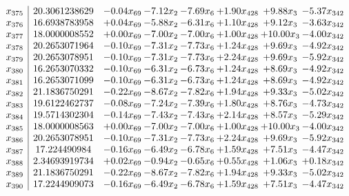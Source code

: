 \documentclass[8pt]{article}
\begin{document}
\[\begin{array}{c| c c@{\hskip 2pt} c@{\hskip 2pt} c@{\hskip 2pt} c@{\hskip 2pt} c@{\hskip 2pt} c@{\hskip 2pt} }
 x_{375}   &  20.3061238629 & -0.04 x_{69} & -7.12 x_{2} & -7.69 x_{6} & +  1.90 x_{428} & +  9.88 x_{3} & -5.37 x_{342}\\
 x_{376}   &  16.6938783958 & +  0.04 x_{69} & -5.88 x_{2} & -6.31 x_{6} & +  1.10 x_{428} & +  9.12 x_{3} & -3.63 x_{342}\\
 x_{377}   &  18.0000008552 & +  0.00 x_{69} & -7.00 x_{2} & -7.00 x_{6} & +  1.00 x_{428} & + 10.00 x_{3} & -4.00 x_{342}\\
 x_{378}   &  20.2653071964 & -0.10 x_{69} & -7.31 x_{2} & -7.73 x_{6} & +  1.24 x_{428} & +  9.69 x_{3} & -4.92 x_{342}\\
 x_{379}   &  20.2653078951 & -0.10 x_{69} & -7.31 x_{2} & -7.73 x_{6} & +  2.24 x_{428} & +  9.69 x_{3} & -5.92 x_{342}\\
 x_{380}   &  16.2653070332 & -0.10 x_{69} & -6.31 x_{2} & -6.73 x_{6} & +  1.24 x_{428} & +  8.69 x_{3} & -4.92 x_{342}\\
 x_{381}   &  16.2653071099 & -0.10 x_{69} & -6.31 x_{2} & -6.73 x_{6} & +  1.24 x_{428} & +  8.69 x_{3} & -4.92 x_{342}\\
 x_{382}   &  21.1836750291 & -0.22 x_{69} & -8.67 x_{2} & -7.82 x_{6} & +  1.94 x_{428} & +  9.33 x_{3} & -5.02 x_{342}\\
 x_{383}   &  19.6122462737 & -0.08 x_{69} & -7.24 x_{2} & -7.39 x_{6} & +  1.80 x_{428} & +  8.76 x_{3} & -4.73 x_{342}\\
 x_{384}   &  19.5714302304 & -0.14 x_{69} & -7.43 x_{2} & -7.43 x_{6} & +  2.14 x_{428} & +  8.57 x_{3} & -5.29 x_{342}\\
 x_{385}   &  18.0000008563 & +  0.00 x_{69} & -7.00 x_{2} & -7.00 x_{6} & +  1.00 x_{428} & + 10.00 x_{3} & -4.00 x_{342}\\
 x_{386}   &  20.2653078951 & -0.10 x_{69} & -7.31 x_{2} & -7.73 x_{6} & +  2.24 x_{428} & +  9.69 x_{3} & -5.92 x_{342}\\
 x_{387}   &  17.224490984 & -0.16 x_{69} & -6.49 x_{2} & -6.78 x_{6} & +  1.59 x_{428} & +  7.51 x_{3} & -4.47 x_{342}\\
 x_{388}   &  2.34693919734 & +  0.02 x_{69} & -0.94 x_{2} & -0.65 x_{6} & +  0.55 x_{428} & +  1.06 x_{3} & +  0.18 x_{342}\\
 x_{389}   &  21.1836750291 & -0.22 x_{69} & -8.67 x_{2} & -7.82 x_{6} & +  1.94 x_{428} & +  9.33 x_{3} & -5.02 x_{342}\\
 x_{390}   &  17.2244909073 & -0.16 x_{69} & -6.49 x_{2} & -6.78 x_{6} & +  1.59 x_{428} & +  7.51 x_{3} & -4.47 x_{342}\\

\end{array}\]
\end{document}
